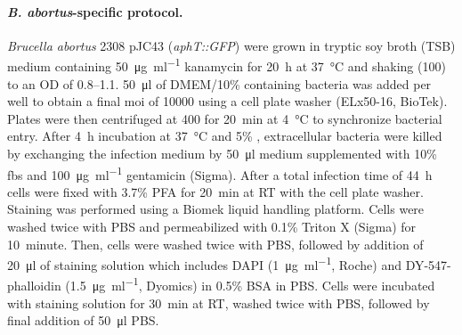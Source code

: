 \paragraph{\textit{B. abortus}-specific protocol.}
\textit{Brucella abortus} 2308 pJC43 (\textit{aphT::GFP}) \citep{Celli2005} were grown in tryptic soy broth (TSB) medium containing \SI{50}{\micro\gram\per\milli\litre} kanamycin for \SI{20}{\hour} at \SI{37}{\celsius} and shaking (\SI{100}{\rpm}) to an OD of 0.8--1.1. \SI{50}{\micro\litre} of DMEM\slash 10\% containing bacteria was added per well to obtain a final \gls{moi} of 10000 using a cell plate washer (ELx50-16, BioTek). Plates were then centrifuged at \SI{400}{\gravity} for \SI{20}{\minute} at \SI{4}{\celsius} to synchronize bacterial entry. After \SI{4}{\hour} incubation at \SI{37}{\celsius} and 5\% , extracellular bacteria were killed by exchanging the infection medium by \SI{50}{\micro\litre} medium supplemented with 10\% \gls{fbs} and \SI{100}{\micro\gram\per\milli\litre} gentamicin (Sigma). After a total infection time of \SI{44}{\hour} cells were fixed with 3.7\% PFA for \SI{20}{\minute} at RT with the cell plate washer. Staining was performed using a Biomek liquid handling platform. Cells were washed twice with PBS and permeabilized with 0.1\% Triton X (Sigma) for \SI{10}{minute}. Then, cells were washed twice with PBS, followed by addition of \SI{20}{\micro\litre} of staining solution which includes DAPI (\SI{1}{\micro\gram\per\milli\litre}, Roche) and DY-547-phalloidin (\SI{1.5}{\micro\gram\per\milli\litre}, Dyomics) in 0.5\% BSA in PBS. Cells were incubated with staining solution for \SI{30}{\minute} at RT, washed twice with PBS, followed by final addition of \SI{50}{\micro\litre} PBS.

